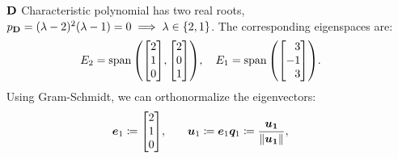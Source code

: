 \documentclass[11pt]{article}
\begin{document}
\begin{enumerate}
\begin{enumerate}[align=left]
                    \pagebreak

              \item[$\mathbf{D}$] Characteristic polynomial has two real roots, $p_{\mathbf{D}} = (\lambda - 2)^2 (\lambda -
                        1) = 0 \implies \lambda \in \left\{2, 1\right\}$.  The corresponding eigenspaces are:
                    \[
                        E_2 = \Span \args{
                            \begin{bmatrix}
                                2 \\ 1 \\ 0
                            \end{bmatrix}
                            \! ,
                            \begin{bmatrix}
                                2 \\ 0 \\ 1
                            \end{bmatrix}
                        }
                        \! , \quad
                        E_1 = \Span \args{
                            \begin{bmatrix*}[r]
                                3 \\ -1 \\ 3
                            \end{bmatrix*}
                        }
                        \! .
                    \]
                    Using Gram-Schmidt, we can orthonormalize the eigenvectors:
                    \[
                        \begin{alignedat}{3}
                             &
                            \vect{e}_1
                            \coloneq
                            \begin{bmatrix}
                                2 \\ 1 \\ 0
                            \end{bmatrix}
                            \! ,
                            \qquad
                             &   &
                            \vect{u}_1
                            \coloneq
                            \vect{e}_1
                             &   &
                            \vect{q}_1
                            \coloneq
                            \frac{\vect{u_1}}{\norm{\vect{u_1}}}
                            ,
                            \\[1em]
                             &

\end{alignedat}\]
\end{enumerate}
\end{enumerate}
\end{document}
